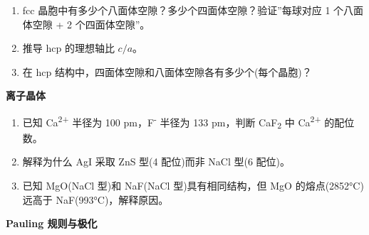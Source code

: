 \documentclass[a4paper,11pt]{ctexart}
\newcommand{\箭}{\ensuremath{\rightarrow}}
\newcommand{\左箭}{\ensuremath{\leftarrow}}
\newcommand{\上箭}{\ensuremath{\uparrow}}
\newcommand{\下箭}{\ensuremath{\downarrow}}
\newcommand{\衡}{\ensuremath{\rightleftharpoons}}
\newcommand{\双箭}{\ensuremath{\leftrightarrow}}
\newcommand{\约等于}{\ensuremath{\approx}}
\newcommand{\小于等于}{\ensuremath{\leq}}
\newcommand{\大于等于}{\ensuremath{\geq}}
\newcommand{\不等于}{\ensuremath{\neq}}
\newcommand{\西格马}{\ensuremath{\sigma}}
\newcommand{\派}{\ensuremath{\pi}}
\begin{document}
\begin{enumerate}
\def\labelenumi{\arabic{enumi}.}
\setcounter{enumi}{8}
\item
  fcc 晶胞中有多少个八面体空隙？多少个四面体空隙？验证''每球对应 1 个八面体空隙 + 2 个四面体空隙''。
\item
  推导 hcp 的理想轴比 \(c/a\)。
\item
  在 hcp 结构中，四面体空隙和八面体空隙各有多少个(每个晶胞)？
\end{enumerate}

\textbf{离子晶体}

\begin{enumerate}
\def\labelenumi{\arabic{enumi}.}
\setcounter{enumi}{11}
\item
  已知 Ca\textsuperscript{2+} 半径为 100 pm，F\textsuperscript{-} 半径为 133 pm，判断 CaF\textsubscript{2} 中 Ca\textsuperscript{2+} 的配位数。
\item
  解释为什么 AgI 采取 ZnS 型(4 配位)而非 NaCl 型(6 配位)。
\item
  已知 MgO(NaCl 型)和 NaF(NaCl 型)具有相同结构，但 MgO 的熔点(2852°C)远高于 NaF(993°C)，解释原因。
\end{enumerate}

\textbf{Pauling 规则与极化}
\end{document}
